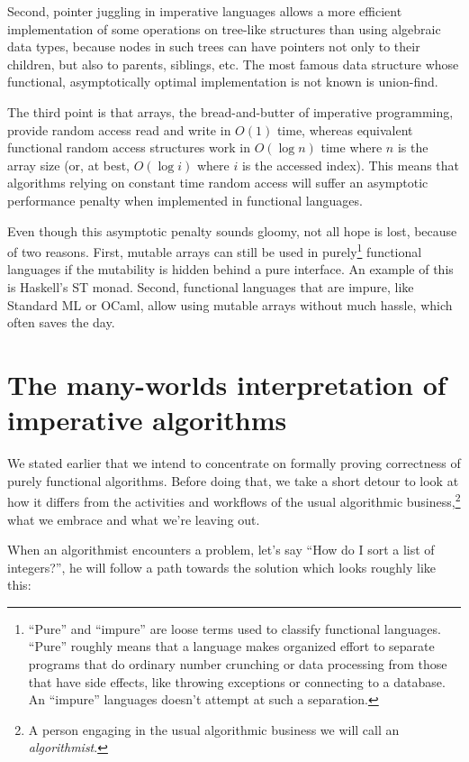 \documentclass[declaration,mgr,english,shortabstract]{iithesis}
\begin{document}
Second, pointer juggling in imperative languages allows a more efficient implementation of some operations on tree-like structures than using algebraic data types, because nodes in such trees can have pointers not only to their children, but also to parents, siblings, etc. The most famous data structure whose functional, asymptotically optimal implementation is not known is union-find. \cite{FunctionalUnionFind}

The third point is that arrays, the bread-and-butter of imperative programming, provide random access read and write in $O(1)$ time, whereas equivalent functional random access structures work in $O(\log n)$ time where $n$ is the array size (or, at best, $O(\log i)$ where $i$ is the accessed index). This means that algorithms relying on constant time random access will suffer an asymptotic performance penalty when implemented in functional languages. \cite{Pippenger}

Even though this asymptotic penalty sounds gloomy, not all hope is lost, because of two reasons. First, mutable arrays can still be used in purely\footnote{``Pure'' and ``impure'' are loose terms used to classify functional languages. ``Pure'' roughly means that a language makes organized effort to separate programs that do ordinary number crunching or data processing from those that have side effects, like throwing exceptions or connecting to a database. An ``impure'' languages doesn't attempt at such a separation.} functional languages if the mutability is hidden behind a pure interface. An example of this is Haskell's ST monad. \cite{STMonad} Second, functional languages that are impure, like Standard ML or OCaml, allow using mutable arrays without much hassle, which often saves the day.

\section{The many-worlds interpretation of imperative algorithms} \label{ch1s3}

We stated earlier that we intend to concentrate on formally proving correctness of purely functional algorithms. Before doing that, we take a short detour to look at how it differs from the activities and workflows of the usual algorithmic business,\footnote{A person engaging in the usual algorithmic business we will call an \textit{algorithmist}.} what we embrace and what we're leaving out.

When an algorithmist encounters a problem, let's say ``How do I sort a list of integers?'', he will follow a path towards the solution which looks roughly like this:
\end{document}
